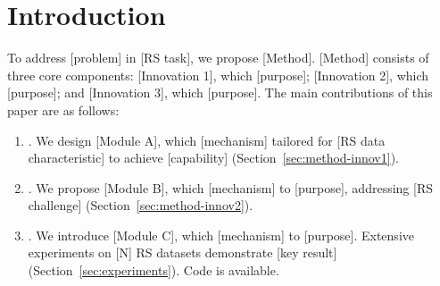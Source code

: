 \documentclass[journal,onecolumn,draftcls]{IEEEtran}
\begin{document}
\section{Introduction}
\label{sec:introduction}







To address [problem] in [RS task], we propose [Method]. [Method] consists of
three core components: [Innovation 1], which [purpose]; [Innovation 2], which
[purpose]; and [Innovation 3], which [purpose]. The main contributions of this
paper are as follows:

\begin{enumerate}
  \item [Innovation 1 contribution]. We design [Module A], which [mechanism]
        tailored for [RS data characteristic] to achieve [capability]
        (Section~\ref{sec:method-innov1}).
  \item [Innovation 2 contribution]. We propose [Module B], which [mechanism]
        to [purpose], addressing [RS challenge] (Section~\ref{sec:method-innov2}).
  \item [Innovation 3 contribution]. We introduce [Module C], which [mechanism]
        to [purpose]. Extensive experiments on [N] RS datasets demonstrate
        [key result] (Section~\ref{sec:experiments}). Code is available.
\end{enumerate}
\end{document}
